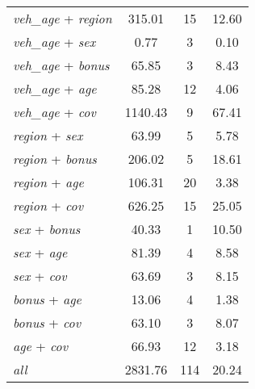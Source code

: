 {\begin{ThreePartTable}
\begin{longtable}{lccc}
    \textit{veh\_age} + \textit{region} &   315.01 &       15 &    12.60 \\
    \textit{veh\_age} + \textit{sex} &     0.77 &        3 &     0.10 \\
    \textit{veh\_age} + \textit{bonus} &    65.85 &        3 &     8.43 \\
    \textit{veh\_age} + \textit{age} &    85.28 &       12 &     4.06 \\
    \textit{veh\_age} + \textit{cov} &  1140.43 &        9 &    67.41 \\
    \textit{region} + \textit{sex} &    63.99 &        5 &     5.78 \\
    \textit{region} + \textit{bonus} &   206.02 &        5 &    18.61 \\
    \textit{region} + \textit{age} &   106.31 &       20 &     3.38 \\
    \textit{region} + \textit{cov} &   626.25 &       15 &    25.05 \\
    \textit{sex} + \textit{bonus} &    40.33 &        1 &    10.50 \\
    \textit{sex} + \textit{age} &    81.39 &        4 &     8.58 \\
    \textit{sex} + \textit{cov} &    63.69 &        3 &     8.15 \\
    \textit{bonus} + \textit{age} &    13.06 &        4 &     1.38 \\
    \textit{bonus} + \textit{cov} &    63.10 &        3 &     8.07 \\
    \textit{age} + \textit{cov} &    66.93 &       12 &     3.18 \\
    \textit{all}\tnote{\ddag} &  2831.76 &      114 &    20.24 \\

\end{longtable}
\end{ThreePartTable}
}
